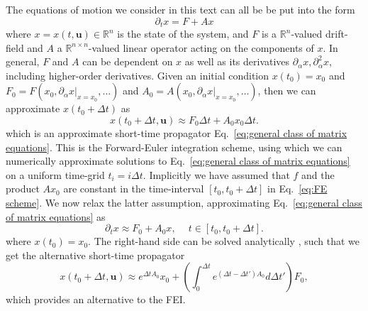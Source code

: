 The equations of motion we consider in this text can all be be put into the form
\begin{equation} \label{eq:general class of matrix equations}
\partial_t x = F + A x
\end{equation}
where $x = x(t,\mathbf{u}) \in \mathbb{R}^n$ is the state of the system, and $F$ is a $\mathbb{R}^n$-valued drift-field and $A$ a $\mathbb{R}^{n \times n}$-valued linear operator acting on the components of $x$. In general, $F$ and $A$ can be dependent on $x$ as well as its derivatives $\partial_\alpha x, \partial^2_\alpha x$, including higher-order derivatives. Given an initial condition $x(t_0) = x_0$ and $F_0 = F(x_0, \partial_\alpha x |_{x = x_0}, \dots)$ and $A_0 = A(x_0, \partial_\alpha x |_{x = x_0}, \dots)$, then we can approximate $x(t_0 + \Delta t)$ as
\begin{equation} \label{eq:FE scheme}
	x(t_0 + \Delta t, \mathbf{u}) \approx F_0 \Delta t + A_0 x_0 \Delta t.
\end{equation}
which is an approximate short-time propagator Eq.~\ref{eq:general class of matrix equations}. This is the Forward-Euler integration scheme, using which we can numerically approximate solutions to Eq.~\ref{eq:general class of matrix equations} on a uniform time-grid $t_i = i \Delta t$. Implicitly we have assumed that $f$ and the product $A x_0$ are constant in the time-interval $[t_0, t_0 + \Delta t]$ in Eq.~\ref{eq:FE scheme}. We now relax the latter assumption, approximating Eq.~\ref{eq:general class of matrix equations} as
\begin{equation} \label{eq:general class of matrix equations}
\partial_t x \approx F_0 + A_0 x,\ \quad t \in [t_0, t_0 + \Delta t].
\end{equation}
where $x(t_0) = x_0$. The right-hand side can be solved analytically \citep{haleOrdinaryDifferentialEquations2009}, such that we get the alternative short-time propagator
\begin{equation} \label{eq:general lie group integrator}
	x(t_0 + \Delta t, \mathbf{u}) \approx e^{\Delta t A_0} x_0 + \left( \int_0^{\Delta t} e^{(\Delta t - \Delta t') A_0} d \Delta t' \right) F_0,
\end{equation}
which provides an alternative to the FEI.

